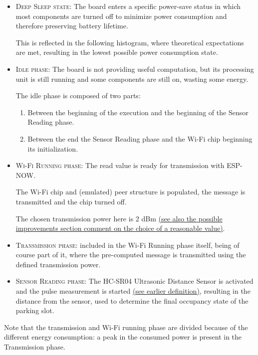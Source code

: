 \documentclass[a4paper,11pt]{article} %
\begin{document}
    \begin{itemize}
        \item \textsc{Deep Sleep state}: The board enters a specific power-save status in which most components are turned off to minimize power consumption and therefore preserving battery lifetime.

        This is reflected in the following histogram, where theoretical expectations are met, resulting in the lowest possible power consumption state.
        \item \textsc{Idle phase}: The board is not providing useful computation, but its processing unit is still running and some components are still on, wasting some energy.

        The idle phase is composed of two parts:
        \begin{enumerate}
            \item Between the beginning of the execution and the beginning of the Sensor Reading phase.
            \item Between the end the Sensor Reading phase and the Wi-Fi chip beginning its initialization.
        \end{enumerate}
        \item \textsc{Wi-Fi Running phase}: The read value is ready for transmission with \textsc{ESP-NOW}.

        The Wi-Fi chip and (emulated) peer structure is populated, the message is transmitted and the chip turned off.

        The chosen transmission power here is 2 dBm \hyperref[subsec:transmission-power-regulation]{(see also the possible improvements section comment on the choice of a reasonable value)}.
        \item \textsc{Transmission phase}: included in the Wi-Fi Running phase itself, being of course part of it, where the pre-computed message is transmitted using the defined transmission power.
        \item \textsc{Sensor Reading phase}: The HC-SR04 Ultrasonic Distance Sensor is activated and the pulse measurement is started \hyperref[ultrasonic-distance-measurement]{(see earlier definition)}, resulting in the distance from the sensor, used to determine the final occupancy state of the parking slot.
    \end{itemize}
    Note that the transmission and Wi-Fi running phase are divided because of the different energy consumption: a peak in the consumed power is present in the Transmission phase.
\end{document}
